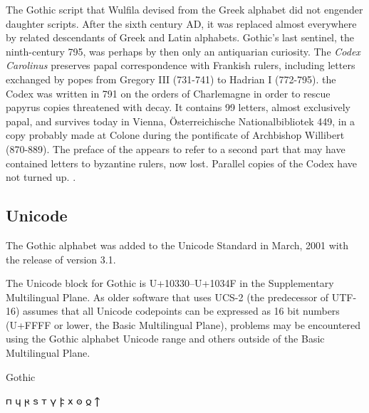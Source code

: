The Gothic script that Wulfila devised from the Greek
alphabet did not engender daughter scripts. After the sixth century
AD, it was replaced almost everywhere by related descendants
of Greek and Latin alphabets. Gothic’s last sentinel, the
ninth-century  795, was perhaps by then
only an antiquarian curiosity. The \emph{Codex Carolinus} preserves papal correspondence
with Frankish rulers, including letters exchanged by popes from Gregory III (731-741) to Hadrian I (772-795). the Codex was written in 791 on the orders of Charlemagne in order to rescue papyrus copies threatened with decay. It contains 99 letters, almost exclusively papal, and survives today in Vienna, \"Osterreichische Nationalbibliotek 449, in a copy probably made at Colone during the pontificate of Archbishop Willibert (870-889). The preface of the  appears to refer to a second part that may have contained letters to byzantine rulers, now lost. Parallel copies of the Codex have not turned up. \citep{jasper2001papal}. 

\subsection{Unicode}

The Gothic alphabet was added to the Unicode Standard in March, 2001 with the release of version 3.1.

The Unicode block for Gothic is U+10330–U+1034F in the Supplementary Multilingual Plane. As older software that uses UCS-2 (the predecessor of UTF-16) assumes that all Unicode codepoints can be expressed as 16 bit numbers (U+FFFF or lower, the Basic Multilingual Plane), problems may be encountered using the Gothic alphabet Unicode range and others outside of the Basic Multilingual Plane.

\begin{scriptexample}[]{Gothic}
\end{scriptexample}
{\gothicfamily
𐍀	𐍁	𐍂	𐍃	𐍄	𐍅	𐍆	𐍇	𐍈	𐍉	𐍊}






